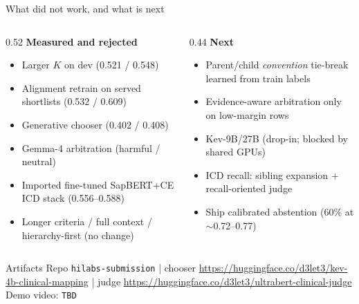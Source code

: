 \documentclass[aspectratio=169,10pt]{beamer}
\begin{document}
\begin{frame}{What did not work, and what is next}
\begin{columns}[T]
\begin{column}{0.52\textwidth}
\textbf{Measured and rejected}
\begin{itemize}\setlength\itemsep{1pt}
\item[$\times$] Larger $K$ on dev (0.521 / 0.548)
\item[$\times$] Alignment retrain on served shortlists (0.532 / 0.609)
\item[$\times$] Generative chooser (0.402 / 0.408)
\item[$\times$] Gemma-4 arbitration (harmful / neutral)
\item[$\times$] Imported fine-tuned SapBERT+CE ICD stack (0.556--0.588)
\item[$\times$] Longer criteria / full context / hierarchy-first (no change)
\end{itemize}
\end{column}
\begin{column}{0.44\textwidth}
\textbf{Next}
\begin{itemize}\setlength\itemsep{1pt}
\item[$\rightarrow$] Parent/child \emph{convention} tie-break learned from train labels
\item[$\rightarrow$] Evidence-aware arbitration only on low-margin rows
\item[$\rightarrow$] Kev-9B/27B (drop-in; blocked by shared GPUs)
\item[$\rightarrow$] ICD recall: sibling expansion + recall-oriented judge
\item[$\rightarrow$] Ship calibrated abstention (60\% at $\sim$0.72--0.77)
\end{itemize}
\end{column}
\end{columns}
\vspace{4mm}
\begin{block}{Artifacts}
\footnotesize
Repo \texttt{hilabs-submission} \;|\;
chooser \url{https://huggingface.co/d3let3/kev-4b-clinical-mapping} \;|\;
judge \url{https://huggingface.co/d3let3/ultrabert-clinical-judge}\\
Demo video: \texttt{TBD}
\end{block}
\end{frame}
\end{document}
